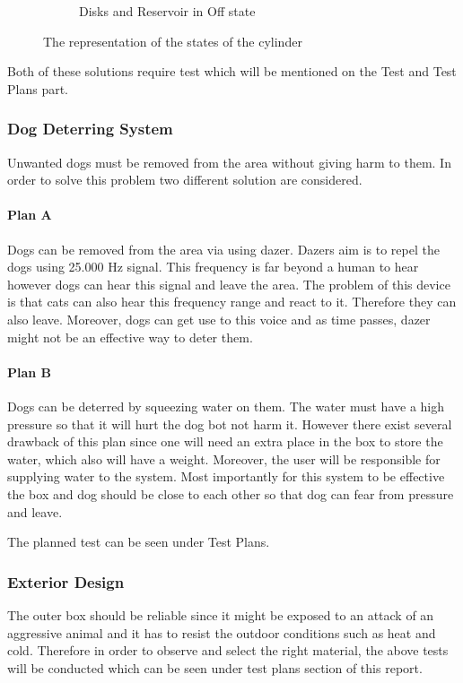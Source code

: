 \begin{figure}[t!]
\begin{subfigure}[b]{0.49\linewidth}
     \caption {Disks and Reservoir in Off state}
     \label{fig:Disk2}
     \end{subfigure}
     \caption{The representation of the states of the cylinder}
     \label{fig:Disk}
\end{figure}

Both of these solutions require test which will be mentioned on the Test and Test Plans part. 

\subsubsection{Dog Deterring System}
Unwanted dogs must be removed from the area without giving harm to them. In order to solve this problem two different solution are considered.
\paragraph{Plan A}
Dogs can be removed from the area via using dazer. Dazers aim is to repel the dogs using 25.000 Hz signal\cite{cite:Dazer}. This frequency is far beyond a human to hear however dogs can hear this signal and leave the area. The problem of this device is that cats can also hear this frequency range and react to it. Therefore they can also leave. Moreover, dogs can get use to this voice and as time passes, dazer might not be an effective way to deter them.
\paragraph{Plan B}
Dogs can be deterred by squeezing water on them. The water must have a high pressure so that it will hurt the dog bot not harm it. However there exist several drawback of this plan since one will need an extra place in the box to store the water, which also will have a weight. Moreover, the user will be responsible for supplying water to the system. Most importantly for this system to be effective the box and dog should be close to each other so that dog can fear from pressure and leave.

The planned test can be seen under Test Plans.

\subsubsection{Exterior Design}
The outer box should be reliable since it might be exposed to an attack of an aggressive animal and it has to resist the outdoor conditions such as heat and cold. Therefore in order to observe and select the right material, the above tests will be conducted which can be seen under test plans section of this report.

